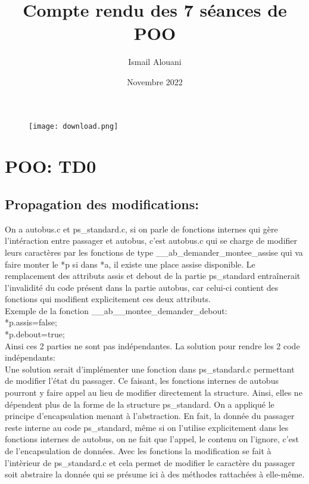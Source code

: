 \documentclass{article}
\title{\huge{Compte rendu des 7 séances de POO}}
\author{Ismail Alouani}
\date{Novembre 2022}
\begin{document}
\maketitle

\begin{figure}[!h]
    \centering
    \texttt{[image: download.png]}
\end{figure}
\newpage
\newpage


\maketitle

\section{POO: TD0}
\subsection{Propagation des modifications:}
On a autobus.c et ps\_standard.c, si on parle de fonctions internes qui gère l'intéraction entre passager et autobus, c'est autobus.c qui se charge de modifier leurs caractères par les fonctions de type \_\_ab\_demander\_montee\_assise qui va faire monter le *p si dans *a, il existe une place assise disponible. 
\newline
Le remplacement des attributs assis et debout de la partie ps\_standard entraînerait
l’invalidité du code présent dans la partie autobus, car celui-ci contient des fonctions qui modifient explicitement ces deux attributs.\\
Exemple de la fonction \_\_ab\_\_montee\_demander\_debout: \\
*p.assis=false;
\\
*p.debout=true;
\\
Ainsi ces 2 parties ne sont pas indépendantes.
\newline
La solution pour rendre les 2 code indépendants:\\
Une solution serait d’implémenter une fonction dans ps\_standard.c permettant de
modifier l’état du passager. Ce faisant, les fonctions internes de autobus pourront y faire appel au lieu de modifier directement la structure. Ainsi, elles ne dépendent plus de la forme de la structure ps\_standard.
\newline
On a appliqué le principe d'encapsulation menant à l'abstraction. En fait, la donnée du passager reste interne au code ps\_standard, même si on l'utilise explicitement dans les fonctions internes de autobus, on ne fait que l'appel, le contenu on l'ignore, c'est de l'encapsulation de données. Avec les fonctions la modification se fait à l'intèrieur de ps\_standard.c et cela permet de modifier le caractère du passager soit abstraire la donnée qui se présume ici à des méthodes rattachées à elle-même.
\end{document}
